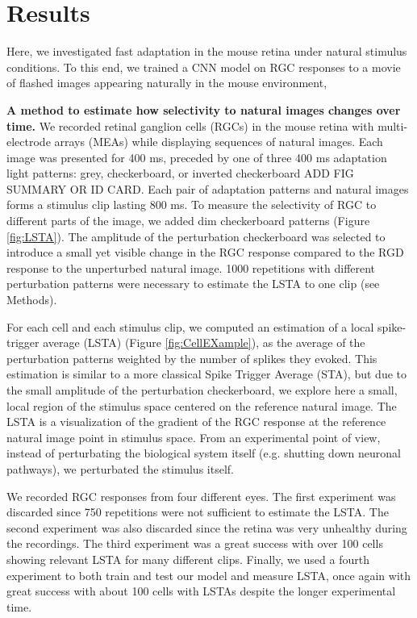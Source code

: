 \section{Results}
\label{sec:results}

Here, we investigated fast adaptation in the mouse retina under natural
stimulus conditions. To this end, we trained a CNN model on RGC responses to a
movie of flashed images appearing naturally in the mouse environment, %

\textbf{A method to estimate how selectivity to natural images changes over time.}
We recorded retinal ganglion cells (RGCs) in the mouse retina with multi-electrode arrays (MEAs) while displaying sequences of natural images.
Each image was presented for 400 ms, preceded by one of three 400 ms adaptation light patterns: grey, checkerboard, or inverted checkerboard ADD FIG SUMMARY OR ID CARD.
Each pair of adaptation patterns and natural images forms a stimulus clip lasting 800 ms.
To measure the selectivity of RGC to different parts of the image, we added dim checkerboard patterns (Figure \ref{fig:LSTA}).
The amplitude of the perturbation checkerboard was selected to introduce a small yet visible change in the RGC response compared to the RGD response to the unperturbed natural image.
1000 repetitions with different perturbation patterns were necessary to estimate the LSTA to one clip (see Methods).

For each cell and each stimulus clip, we computed an estimation of a local
spike-trigger average (LSTA) (Figure \ref{fig:CellEXample}), as the average of the
perturbation patterns weighted by the number of splikes they evoked. This
estimation is similar to a more classical Spike Trigger Average (STA), but due
to the small amplitude of the perturbation checkerboard, we explore here a
small, local region of the stimulus space centered on the reference natural
image. The LSTA is a visualization of the gradient of the RGC response at the
reference natural image point in stimulus space. From an experimental point of
view, instead of perturbating the biological system itself (e.g. shutting down
neuronal pathways), we perturbated the stimulus itself.

We recorded RGC responses from four different eyes. The first experiment was
discarded since 750 repetitions were not sufficient to estimate the LSTA. The
second experiment was also discarded since the retina was very unhealthy during
the recordings. The third experiment was a great success with over 100 cells
showing relevant LSTA for many different clips. Finally, we used a fourth
experiment to both train and test our model and measure LSTA, once again with
great success with about 100 cells with LSTAs despite the longer experimental
time.

